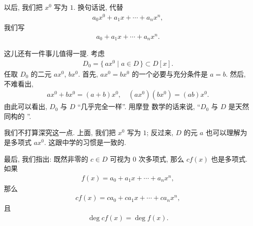 \begin{remark}
    以后, 我们把 $x^0$ 写为 $1$. 换句话说, 代替
    \begin{align*}
        a_0 x^0 + a_1 x + \cdots + a_n x^n,
    \end{align*}
    我们写
    \begin{align*}
        a_0 + a_1 x + \cdots + a_n x^n.
    \end{align*}

    这儿还有一件事儿值得一提. 考虑
    \begin{align*}
        D_0 = \{\, ax^0 \mid a \in D \,\} \subset D[x].
    \end{align*}
    任取 $D_0$ 的二元 $ax^0$, $bx^0$. 首先, $ax^0 = bx^0$ 的一个必要与充分条件是 $a=b$. 然后, 不难看出,
    \begin{align*}
        ax^0 + bx^0 = (a+b)x^0, \quad (ax^0)(bx^0) = (ab)x^0.
    \end{align*}
    由此可以看出, $D_0$ 与 $D$ ``几乎完全一样''. 用摩登  数学的话来说, ``$D_0$ 与 $D$ 是天然同构的 ''.

    我们不打算深究这一点. 上面, 我们把 $x^0$ 写为 $1$; 反过来, $D$ 的元 $a$ 也可以理解为是多项式 $ax^0$. 这跟中学的习惯是一致的.

    最后, 我们指出: 既然非零的 $c \in D$ 可视为 $0$ 次多项式, 那么 $cf(x)$ 也是多项式. 如果
    \begin{align*}
        f(x) = a_0 + a_1 x + \cdots + a_n x^n,
    \end{align*}
    那么
    \begin{align*}
        cf(x) = ca_0 + ca_1 x + \cdots + ca_n x^n,
    \end{align*}
    且
    \begin{align*}
        \deg cf(x) = \deg f(x).
    \end{align*}
\end{remark}

